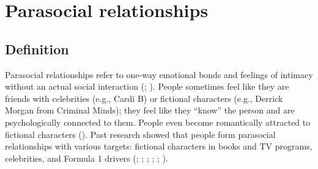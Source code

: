 \documentclass[
]{udthesis}
\begin{document}
\section{Parasocial relationships}\label{parasocial-relationships}

\subsection{Definition}\label{definition}

Parasocial relationships refer to one-way emotional bonds and feelings
of intimacy without an actual social interaction (; ). People sometimes feel like they are friends with
celebrities (e.g., Cardi B) or fictional characters (e.g., Derrick
Morgan from Criminal Minds); they feel like they ``know'' the person and
are psychologically connected to them. People even become romantically
attracted to fictional characters (). Past research showed
that people form parasocial relationships with various targets:
fictional characters in books and TV programs, celebrities, and Formula
1 drivers (; ; ; ; ; ).
\end{document}
